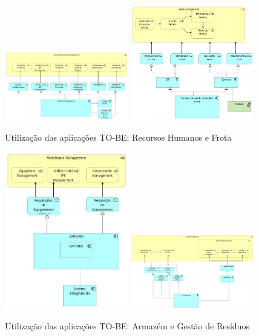 \documentclass[12pt,a4paper,final]{article}
\begin{document}
    \begin{figure}[H]
        \centering
        \includegraphics[width=0.48\textwidth]{Q16 - Application Usage - Human Ressources Management.jpg}
        \includegraphics[width=0.48\textwidth]{Q16 - Application Usage - Fleet Management.jpg}
        \caption{Utilização das aplicações TO-BE: Recursos Humanos e Frota}
        \label{fig:q16-usage-rh-frota}
    \end{figure}

    \begin{figure}[H]
        \centering
        \includegraphics[width=0.48\textwidth]{Q16 - Application Usage - Warehouse Management.jpg}
        \includegraphics[width=0.48\textwidth]{Q16 - Application Usage - Waste Management.jpg}
        \caption{Utilização das aplicações TO-BE: Armazém e Gestão de Resíduos}
        \label{fig:q16-usage-armazem-residuos}
    \end{figure}
\end{document}
